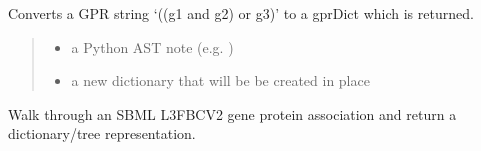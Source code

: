 \documentclass[letterpaper,12pt,english]{sphinxmanual}
\begin{document}

\begin{fulllineitems}
\label{\detokenize{api/io:cbmpy.CBXML.sbml_getGPRasDictFBCv1}}
\pysigstartsignatures
\pysiglinewithargsret
{}
{\sphinxparamcomma {}}
{}
\pysigstopsignatures
\sphinxAtStartPar
Converts a GPR string ‘((g1 and g2) or g3)’ to a gprDict which is returned.
\begin{quote}\begin{description}
\begin{itemize}
\item {} 
\sphinxAtStartPar
{} \textendash{} a Python AST note (e.g. )

\item {} 
\sphinxAtStartPar
{} \textendash{} a new dictionary that will be be created in place

\end{itemize}

\end{description}\end{quote}

\end{fulllineitems}


\begin{fulllineitems}
\label{\detokenize{api/io:cbmpy.CBXML.sbml_getGPRasDictFBCv2}}
\pysigstartsignatures
\pysiglinewithargsret
{}
{\sphinxparamcomma {}\sphinxparamcomma {}}
{}
\pysigstopsignatures
\sphinxAtStartPar
Walk through an SBML L3FBCV2 gene protein association and return a
dictionary/tree representation.

\end{fulllineitems}

\end{document}
